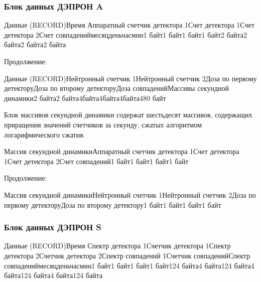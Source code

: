 \documentclass[a4paper,portrait,12pt]{article}
\begin{document}
{{{{\begin{itemize}
\end{itemize}
\textbf{{\large \newpage
}}


\begin{flushleft}

\end{flushleft}


\subsubsection*{\textbf{Блок данных ДЭПРОН A}}




{\small Данные (RECORD)Время Аппаратный счетчик детектора }{\small 1}{\small Счет детектора }{\small 1}{\small Счет детектора 2Счет совпадениймесяцденьчасмин1 байт1 байт1 байт1 байт2 байта2 байта2 байта2 байта}


Продолжение:


{\small Данные (RECORD)Нейтронный счетчик 1Нейтронный счетчик 2Доза по первому детекторуДоза по второму детекторуДоза совпаденийМассивы секундной динамики2 байта2 байта}{\small 4}{\small  байта}{\small 4}{\small  байта}{\small 4}{\small  байта480 байт}





{\small Блок массивов секундной динамики содержат шестьдесят массивов, содержащих приращения значений счетчиков за секунду, сжатых алгоритмом логарифмического сжатия.}





{\small Массив секундной динамикиАппаратный счетчик детектора }{\small 1}{\small Счет детектора }{\small 1}{\small Счет детектора 2Счет совпадений}1 байт1 байт1 байт1 байт


Продолжение:


{\small Массив секундной динамикиНейтронный счетчик 1Нейтронный счетчик 2Доза по первому детекторуДоза по второму детектору}1 байт1 байт1 байт1 байт


\newpage






\subsubsection*{\textbf{Блок данных ДЭПРОН S}}




{\footnotesize Данные (RECORD)Время Спектр детектора 1Счетчик детектора 1Спектр детектора 2Счетчик детектора 2Спектр совпадений 1Счетчик совпаденийСпектр совпадениймесяцденьчасмин1 байт1 байт1 байт1 байт124 байта4 байта124 байта4 байта124 байта4 байта124 байта}


}}}}
\end{document}
